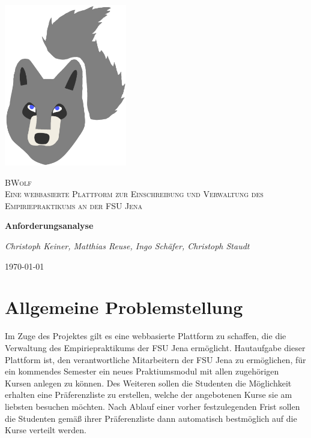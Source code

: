 \documentclass[12pt,a4paper]{article}
\begin{document}
    \onehalfspacing
    
    \begin{titlepage}
        \centering
        \includegraphics[width=0.4\textwidth]{./../LogoSoFar.png}\par\vspace{1cm}
        {\scshape \LARGE BWolf \\ \Large Eine webbasierte Plattform zur
            Einschreibung und Verwaltung des
            Empiriepraktikums an der FSU Jena\par}
        \vspace{1.5cm}
        {\huge\bfseries Anforderungsanalyse\par}
        \vspace{1.5cm}
        {\large\itshape Christoph Keiner, Matthias Reuse, Ingo Schäfer, Christoph Staudt\par}
        \vspace{1.0cm}
        {\large \today\par}
    \end{titlepage}

    \tableofcontents 
    \clearpage
    
    \section{Allgemeine Problemstellung}
    \label{Problemstellung}
        Im Zuge des Projektes gilt es eine webbasierte Plattform zu schaffen, die die Verwaltung des Empiriepraktikums der FSU Jena ermöglicht.
        Hautaufgabe dieser Plattform ist, den verantwortliche Mitarbeitern der FSU Jena zu ermöglichen, für ein kommendes Semester ein neues Praktiumsmodul mit allen zugehörigen Kursen anlegen zu können.
        Des Weiteren sollen die Studenten die Möglichkeit erhalten eine Präferenzliste zu erstellen, welche der angebotenen Kurse sie am liebsten besuchen möchten.
        Nach Ablauf einer vorher festzulegenden Frist sollen die Studenten gemäß ihrer Präferenzliste dann automatisch bestmöglich auf die Kurse verteilt werden.     
    
\end{document}
